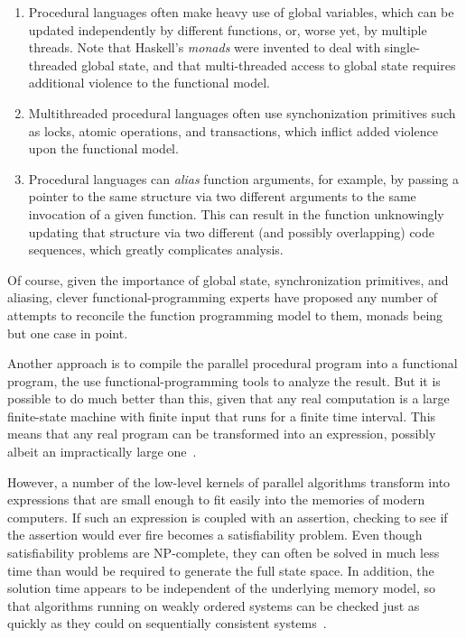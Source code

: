 \begin{enumerate}
\item	Procedural languages often make heavy use of global variables,
	which can be updated independently by different
	functions, or, worse yet, by multiple threads.
	Note that Haskell's \emph{monads} were invented to deal with
	single-threaded global state, and that multi-threaded access to
	global state requires additional violence to the functional model.
\item	Multithreaded procedural languages often use synchonization
	primitives such as locks, atomic operations, and transactions,
	which inflict added violence upon the functional model.
\item	Procedural languages can \emph{alias} function arguments,
	for example, by passing a pointer to the same structure via two
	different arguments to the same invocation of a given function.
	This can result in the function unknowingly updating that
	structure via two different (and possibly overlapping) code
	sequences, which greatly complicates analysis.
\end{enumerate}

Of course, given the importance of global state, synchronization
primitives, and aliasing, clever functional-programming experts have
proposed any number of attempts to reconcile the function programming
model to them, monads being but one case in point.

Another approach is to compile the parallel procedural program into
a functional program, the use functional-programming tools to analyze
the result.
But it is possible to do much better than this, given that any real
computation is a large finite-state machine with finite input that
runs for a finite time interval.
This means that any real program can be transformed into an expression,
possibly albeit an impractically large one~\cite{VijayDSilva2012-sas}.

However, a number of the low-level kernels of parallel algorithms transform
into expressions that are small enough to fit easily into the memories
of modern computers.
If such an expression is coupled with an assertion, checking to see if
the assertion would ever fire becomes a satisfiability problem.
Even though satisfiability problems are NP-complete, they can often
be solved in much less time than would be required to generate the
full state space.
In addition, the solution time appears to be independent of the underlying
memory model, so that algorithms running on weakly ordered systems
can be checked just as quickly as they could on sequentially consistent
systems~\cite{JadeAlglave2013-cav}.

